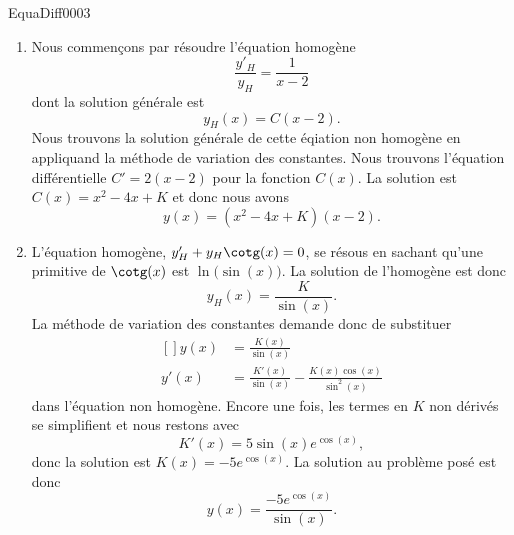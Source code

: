 \begin{corrige}{EquaDiff0003}

\begin{enumerate}


\item
Nous commençons par résoudre l'équation homogène
\begin{equation}
	\frac{ y'_H }{ y_H }=\frac{1}{ x-2 }
\end{equation}
dont la solution générale est
\begin{equation}
	y_H(x)=C(x-2).
\end{equation}
Nous trouvons la solution générale de cette éqiation non homogène en appliquand la méthode de variation des constantes. Nous trouvons l'équation différentielle \( C'=2(x-2)\) pour la fonction \( C(x)\). La solution est $C(x)=x^2-4x+K$ et donc nous avons
\begin{equation}
	y(x)=(x^2-4x+K)(x-2).
\end{equation}

\item
L'équation homogène, $y'_H+y_H\cotg(x)=0$, se résous en sachant qu'une primitive de $\cotg(x)$ est $\ln\big(\sin(x)\big)$. La solution de l'homogène est donc
\begin{equation}
	y_H(x)=\frac{ K }{ \sin(x) }.
\end{equation}
La méthode de variation des constantes demande donc de substituer
\begin{equation}
	\begin{aligned}[]
		y(x)&=\frac{ K(x) }{ \sin(x) }\\
		y'(x)&=\frac{ K'(x) }{ \sin(x) }-\frac{ K(x)\cos(x) }{ \sin^2(x) }
	\end{aligned}
\end{equation}
dans l'équation non homogène. Encore une fois, les termes en $K$ non dérivés se simplifient et nous restons avec
\begin{equation}
	K'(x)=5\sin(x) e^{\cos(x)},
\end{equation}
donc la solution est $K(x)=-5 e^{\cos(x)}$. La solution au problème posé est donc
\begin{equation}
	y(x)=\frac{ -5 e^{\cos(x)} }{ \sin(x) }.
\end{equation}


\end{enumerate}


\end{corrige}
